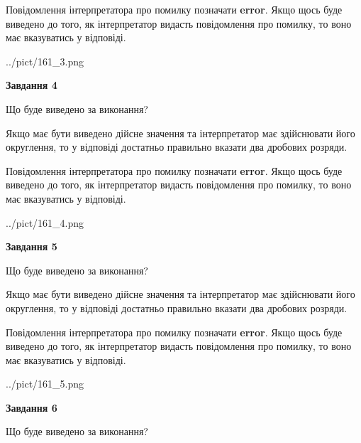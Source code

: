 \documentclass[12pt, ukrainian]{article}
\begin{document}
{\begin {Large}
Повідомлення інтерпретатора про помилку позначати \textbf{error}.
Якщо щось буде виведено до того, як інтерпретатор видасть повідомлення про помилку, 
то воно має вказуватись у відповіді. \par

\begin{center}
	{../pict/161_3.png}
\end{center}
\newpage

{\begin {center}\textbf{Завдання 4}\end {center}}\par
Що буде виведено за виконання? \par

Якщо має бути виведено дійсне значення та інтерпретатор має здійснювати його округлення, 
то у відповіді достатньо правильно вказати два дробових розряди.

Повідомлення інтерпретатора про помилку позначати \textbf{error}.
Якщо щось буде виведено до того, як інтерпретатор видасть повідомлення про помилку, 
то воно має вказуватись у відповіді. \par

\begin{center}
	{../pict/161_4.png}
\end{center}
\newpage

{\begin {center}\textbf{Завдання 5}\end {center}}\par
Що буде виведено за виконання? \par

Якщо має бути виведено дійсне значення та інтерпретатор має здійснювати його округлення, 
то у відповіді достатньо правильно вказати два дробових розряди.

Повідомлення інтерпретатора про помилку позначати \textbf{error}.
Якщо щось буде виведено до того, як інтерпретатор видасть повідомлення про помилку, 
то воно має вказуватись у відповіді. \par

\begin{center}
	{../pict/161_5.png}
\end{center}
\newpage

{\begin {center}\textbf{Завдання 6}\end {center}}\par
Що буде виведено за виконання? \par


\end{Large}}
\end{document}
